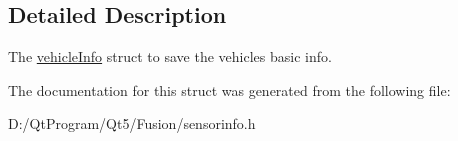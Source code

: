 \subsection{Detailed Description}
The \hyperlink{struct_sensor_info_1_1vehicle_info}{vehicle\+Info} struct to save the vehicle\textquotesingle{}s basic info. 

The documentation for this struct was generated from the following file\+:\begin{DoxyCompactItemize}
\item 
D\+:/\+Qt\+Program/\+Qt5/\+Fusion/sensorinfo.\+h\end{DoxyCompactItemize}
